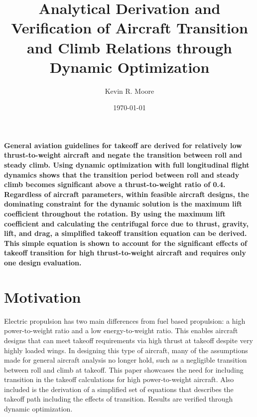 \documentclass[10pt,english]{article}
\title{\vspace{-20pt}Analytical Derivation and Verification of Aircraft Transition and Climb Relations through Dynamic Optimization }
\author{Kevin R. Moore}
\affil{\vspace{-10pt}Brigham Young University}
\date{\today}
\begin{document}
\maketitle

\textbf{General aviation guidelines for takeoff are derived for relatively low thrust-to-weight aircraft and negate the transition between roll and steady climb.  Using dynamic optimization with full longitudinal flight dynamics shows that the transition period between roll and steady climb becomes significant above a thrust-to-weight ratio of 0.4.   Regardless of aircraft parameters, within feasible aircraft designs, the dominating constraint for the dynamic solution is the maximum lift coefficient throughout the rotation.  By using the maximum lift coefficient and calculating the centrifugal force due to thrust, gravity, lift, and drag, a simplified takeoff transition equation can be derived.  This simple equation is shown to account for the significant effects of takeoff transition for high thrust-to-weight aircraft and requires only one design evaluation.  }

\begin{multicols}{2}
\printnomenclature
\end{multicols}

\section{Motivation}

Electric propulsion has two main differences from fuel based propulsion: a high power-to-weight ratio and a low energy-to-weight ratio.  This enables aircraft designs that can meet takeoff requirements via high thrust at takeoff despite very highly loaded wings\cite{leap}.  In designing this type of aircraft, many of the assumptions made for general aircraft analysis no longer hold, such as a negligible transition between roll and climb at takeoff.  This paper showcases the need for including transition in the takeoff calculations for high power-to-weight aircraft.  Also included is the derivation of a simplified set of equations that describes the takeoff path including the effects of transition.  Results are verified through dynamic optimization.
\end{document}
